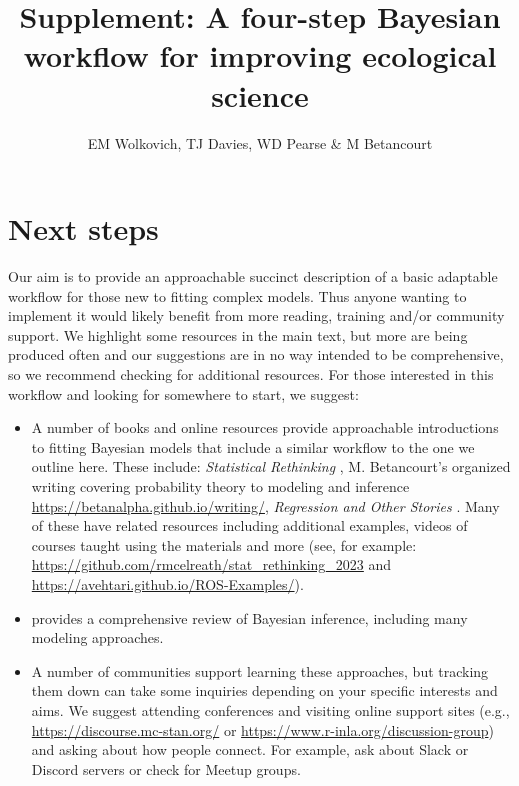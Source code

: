 \documentclass[11pt]{article}
\begin{document}


\renewcommand{\refname}{\CHead{}}

\title{Supplement: A four-step Bayesian workflow for improving ecological science}
\author{EM Wolkovich, TJ Davies, WD Pearse \& M Betancourt}
\maketitle

\renewcommand{\thetable}{S\arabic{table}}
\renewcommand{\thefigure}{S\arabic{figure}}

\section*{Next steps}
Our aim is to provide an approachable succinct description of a basic adaptable workflow for those new to fitting complex models. Thus anyone wanting to implement it would likely benefit from more reading, training and/or community support. We highlight some resources in the main text, but more are being produced often and our suggestions are in no way intended to be comprehensive, so we recommend checking for additional resources. For those interested in this workflow and looking for somewhere to start, we suggest:
\begin{itemize}
\item A number of books and online resources provide approachable introductions to fitting Bayesian models that include a similar workflow to the one we outline here. These include: \emph{Statistical Rethinking} \citep{statrethink}, M. Betancourt's organized writing covering probability theory to modeling and inference \url{https://betanalpha.github.io/writing/}, \emph{Regression and Other Stories} \citep{regotherstories}. Many of these have related resources including additional examples, videos of courses taught using the materials and more (see, for example: \url{https://github.com/rmcelreath/stat_rethinking_2023} and \url{https://avehtari.github.io/ROS-Examples/}). 
\item \citet{BDA} provides a comprehensive review of Bayesian inference, including many modeling approaches. 
\item A number of communities support learning these approaches, but tracking them down can take some inquiries depending on your specific interests and aims. We suggest attending conferences and visiting online support sites (e.g., \url{https://discourse.mc-stan.org/} or \url{https://www.r-inla.org/discussion-group}) and asking about how people connect. For example, ask about Slack or Discord servers or check for Meetup groups. 
\end{itemize}
\end{document}
